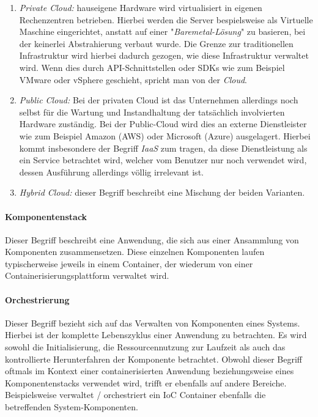 \begin{enumerate}
  \item \emph{Private Cloud:} hauseigene Hardware wird virtualisiert in eigenen Rechenzentren betrieben. Hierbei werden die Server bespielsweise als Virtuelle Maschine eingerichtet, anstatt auf einer "\emph{Baremetal-Lösung}" zu basieren, bei der keinerlei Abstrahierung verbaut wurde. Die Grenze zur traditionellen Infrastruktur wird hierbei dadurch gezogen, wie diese Infrastruktur verwaltet wird. Wenn dies durch API-Schnittstellen oder SDKs wie zum Beispiel VMware oder vSphere geschieht, spricht man von der \emph{Cloud}. 
  \item \emph{Public Cloud:} Bei der privaten Cloud ist das Unternehmen allerdings noch selbst für die Wartung und Instandhaltung der tatsächlich involvierten Hardware zuständig. Bei der Public-Cloud wird dies an externe Dienstleister wie zum Beispiel Amazon (AWS) oder Microsoft (Azure) ausgelagert. Hierbei kommt insbesondere der Begriff \emph{IaaS} zum tragen, da diese Dienstleistung als ein Service betrachtet wird, welcher vom Benutzer nur noch verwendet wird, dessen Ausführung allerdings völlig irrelevant ist.
  \item \emph{Hybrid Cloud:} dieser Begriff beschreibt eine Mischung der beiden Varianten.
\end{enumerate}

\paragraph{Komponentenstack}
Dieser Begriff beschreibt eine Anwendung, die sich aus einer Ansammlung von Komponenten zusammensetzen. Diese einzelnen Komponenten laufen typischerweise jeweils in einem Container, der wiederum von einer Containerisierungsplattform verwaltet wird.

\paragraph{Orchestrierung}
Dieser Begriff bezieht sich auf das Verwalten von Komponenten eines Systems. Hierbei ist der komplette Lebenszyklus einer Anwendung zu betrachten. Es wird sowohl die Initialisierung, die Ressourcennutzung zur Laufzeit als auch das kontrollierte Herunterfahren der Komponente betrachtet. Obwohl dieser Begriff oftmals im Kontext einer containerisierten Anwendung beziehungsweise eines Komponentenstacks verwendet wird, trifft er ebenfalls auf andere Bereiche. Beispielsweise verwaltet / orchestriert ein IoC Container ebenfalls die betreffenden System-Komponenten.

